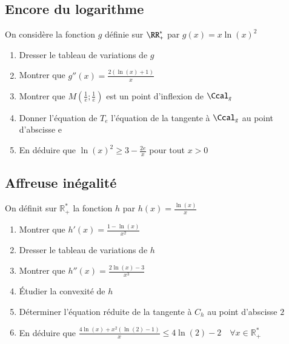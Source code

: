 \documentclass[oneside,12pt]{article}          %
\begin{document}
\subsection{Encore du logarithme}
On considère la fonction $g$ définie sur $\RR_+^*$ par $g(x)=x\ln(x)^2$
\begin{enumerate}
    \item Dresser le tableau de variations de $g$
    \item Montrer que $g''(x)=\frac{2(\ln(x)+1)}{x}$
    \item Montrer que $M\left(\frac{1}{e};\frac{1}{e}\right)$ est un point d'inflexion de $\Ccal_g$
    \item Donner l'équation de $T_e$ l'équation de la tangente à $\Ccal_g$ au point d'abscisse e
    \item En déduire que $\ln(x)^2\geq3-\frac{2e}{x}$ pour tout $x>0$
\end{enumerate}



\subsection{Affreuse inégalité}
On définit sur $\mathbb{R}^*_+$ la fonction $h$ par $h(x) = \frac{\ln(x)}{x}$
\begin{enumerate}
    \item Montrer que $h'(x) = \frac{1 - \ln(x)}{x^2}$
    \item Dresser le tableau de variations de $h$
    \item Montrer que $h''(x) = \frac{2 \ln(x) - 3}{x^3}$
    \item Étudier la convexité de $h$
    \item Déterminer l'équation réduite de la tangente à $C_h$ au point d'abscisse $2$
    \item En déduire que $\frac{4 \ln(x) + x^2 (\ln(2) - 1)}{x} \leq 4\ln(2)-2 \quad \forall x \in \mathbb{R}^*_+$
\end{enumerate}
\end{document}
